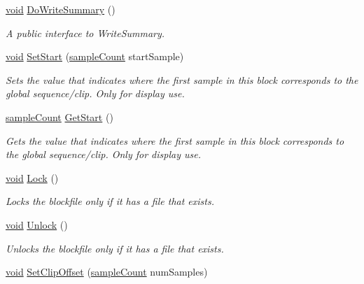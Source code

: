 \begin{DoxyCompactItemize}
\hyperlink{sound_8c_ae35f5844602719cf66324f4de2a658b3}{void} \hyperlink{class_o_d_p_c_m_alias_block_file_a4294c50df9862c688da8d15035215f88}{Do\+Write\+Summary} ()
\begin{DoxyCompactList}\small\item\em A public interface to Write\+Summary. \end{DoxyCompactList}\item 
\hyperlink{sound_8c_ae35f5844602719cf66324f4de2a658b3}{void} \hyperlink{class_o_d_p_c_m_alias_block_file_afc69161dd2f83cd8ba0f59bdf6691ef9}{Set\+Start} (\hyperlink{include_2audacity_2_types_8h_afa427e1f521ea5ec12d054e8bd4d0f71}{sample\+Count} start\+Sample)
\begin{DoxyCompactList}\small\item\em Sets the value that indicates where the first sample in this block corresponds to the global sequence/clip. Only for display use. \end{DoxyCompactList}\item 
\hyperlink{include_2audacity_2_types_8h_afa427e1f521ea5ec12d054e8bd4d0f71}{sample\+Count} \hyperlink{class_o_d_p_c_m_alias_block_file_a1d8885341e139e687852e8ed84b370ab}{Get\+Start} ()
\begin{DoxyCompactList}\small\item\em Gets the value that indicates where the first sample in this block corresponds to the global sequence/clip. Only for display use. \end{DoxyCompactList}\item 
\hyperlink{sound_8c_ae35f5844602719cf66324f4de2a658b3}{void} \hyperlink{class_o_d_p_c_m_alias_block_file_a7af813c1503fdc98db4cc69a524e5679}{Lock} ()
\begin{DoxyCompactList}\small\item\em Locks the blockfile only if it has a file that exists. \end{DoxyCompactList}\item 
\hyperlink{sound_8c_ae35f5844602719cf66324f4de2a658b3}{void} \hyperlink{class_o_d_p_c_m_alias_block_file_a0533a1608bf3986e73e0eccea7fff703}{Unlock} ()
\begin{DoxyCompactList}\small\item\em Unlocks the blockfile only if it has a file that exists. \end{DoxyCompactList}\item 
\hyperlink{sound_8c_ae35f5844602719cf66324f4de2a658b3}{void} \hyperlink{class_o_d_p_c_m_alias_block_file_a007ed81516a03caeb97703f665fd9cf7}{Set\+Clip\+Offset} (\hyperlink{include_2audacity_2_types_8h_afa427e1f521ea5ec12d054e8bd4d0f71}{sample\+Count} num\+Samples)

\end{DoxyCompactItemize}
